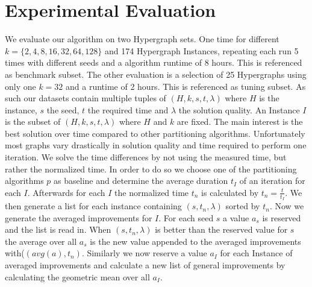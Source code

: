 \documentclass[a4paper,12pt,bibtotoc,titlepage, liststotoc,BCOR7mm,headsepline,pointlessnumbers]{scrbook}
\numberwithin{equation}{section}
\begin{document}
\chapter{Experimental Evaluation}
We evaluate our algorithm on two Hypergraph sets. One time for different $k = \{2,4,8,16,32,64,128\}$ and 174 Hypergraph Instances, repeating
each run 5 times with different seeds and a algorithm runtime of 8 hours. This is referenced as benchmark subset. The other evaluation is a
selection of 25 Hypergraphs using only one $k = 32$ and a runtime of 2 hours. This is referenced as tuning subset. 
As such our datasets contain multiple tuples of $(H, k, s, t, \lambda)$ where $H$ is the instance, $s$ the seed, $t$ the required time and $\lambda$ the solution quality. An Instance $I$ is the subset of $(H, k, s, t, \lambda)$ where $H$ and $k$ are fixed.
The main interest is the best solution over time compared to other partitioning algorithms. Unfortunately most graphs vary drastically in solution quality and time required to perform one iteration. We solve the time differences by not using the measured time, but rather the normalized time. 
In order to do so we choose one of the partitioning algorithms $p$ as baseline and determine the average duration $t_I$ of an iteration for each $I$. Afterwards for each $I$ the normalized time $t_n$ is calculated by $t_n = \frac{t}{t_I}$. We then generate a list for each instance containing $(s, t_n, \lambda)$ sorted by $t_n$. Now we generate the averaged improvements for $I$. For each seed $s$ a value $a_s$ is reserved and the list is read in. When $(s, t_n, \lambda)$ is better than the reserved value for $s$ the average over all $a_s$ 
is the new value appended to the averaged improvements with($(avg(a), t_n)$. Similarly we now reserve a value $a_I$ for each Instance of averaged improvements and calculate a new list of general improvements by calculating the geometric mean over all $a_I$. 
\end{document}
